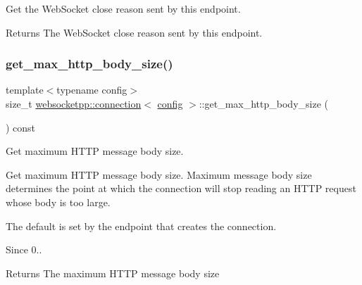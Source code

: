 Get the Web\+Socket close reason sent by this endpoint. 

\begin{DoxyReturn}{Returns}
The Web\+Socket close reason sent by this endpoint. 
\end{DoxyReturn}
\mbox{\label{classwebsocketpp_1_1connection_a9a050215a9f1d7652bcd8c543ae5f38c}} 
\subsubsection{\texorpdfstring{get\+\_\+max\+\_\+http\+\_\+body\+\_\+size()}{get\_max\_http\_body\_size()}}
{\footnotesize\ttfamily template$<$typename config$>$ \\
size\+\_\+t \mbox{\hyperlink{classwebsocketpp_1_1connection}{websocketpp\+::connection}}$<$ \mbox{\hyperlink{classconfig}{config}} $>$\+::get\+\_\+max\+\_\+http\+\_\+body\+\_\+size (\begin{DoxyParamCaption}{ }\end{DoxyParamCaption}) const\hspace{0.3cm}{\ttfamily [inline]}}



Get maximum H\+T\+TP message body size. 

Get maximum H\+T\+TP message body size. Maximum message body size determines the point at which the connection will stop reading an H\+T\+TP request whose body is too large.

The default is set by the endpoint that creates the connection.

\begin{DoxySince}{Since}
0..
\end{DoxySince}
\begin{DoxyReturn}{Returns}
The maximum H\+T\+TP message body size 
\end{DoxyReturn}
\mbox{\label{classwebsocketpp_1_1connection_af7739a5097ae6562bc9b0880731a2857}} 
